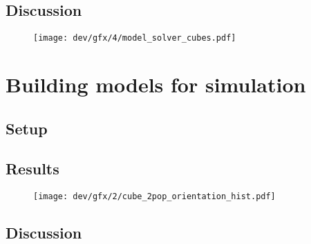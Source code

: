 \subsection{Discussion}
% 
\begin{figure}[!t]
\centering
\texttt{[image: dev/gfx/4/model\_solver\_cubes.pdf]}
\caption{}
\end{figure}
% 
\section{Building models for simulation}
% 
\subsection{Setup}
% 
\subsection{Results}
% 
\begin{figure}[!t]
\centering
\texttt{[image: dev/gfx/2/cube\_2pop\_orientation\_hist.pdf]}
\caption{}
\end{figure}
% 
\subsection{Discussion}